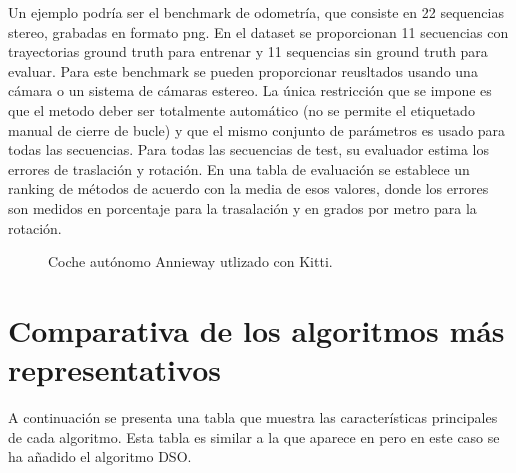 \begin {enumerate}
Un ejemplo podría ser el benchmark de odometría, que consiste en 22 sequencias stereo, grabadas en formato png. En el dataset se proporcionan 11 secuencias con trayectorias ground truth para entrenar y 11 sequencias sin ground truth para evaluar. Para este benchmark se pueden proporcionar reusltados usando una cámara o un sistema de cámaras estereo.
La única restricción que se impone es que el metodo deber ser totalmente automático (no se permite el etiquetado manual de cierre de bucle) y que el mismo conjunto de parámetros es usado para todas las secuencias.
Para todas las secuencias de test, su evaluador estima los errores de traslación y rotación. En una tabla de evaluación se establece un ranking de métodos de acuerdo con la media de esos valores, donde los errores son medidos en porcentaje para la trasalación y en grados por metro para la rotación.
\begin{figure}[H]
\begin{center}
\end{center}
\caption{Coche autónomo Annieway utlizado con Kitti.}
\end{figure}

\end {enumerate}


\section{Comparativa de los algoritmos más representativos} 
A continuación se presenta una tabla que muestra las características principales de cada algoritmo. Esta tabla es similar a la que aparece en \cite{Perdices17} pero en este caso se ha añadido el algoritmo DSO.

